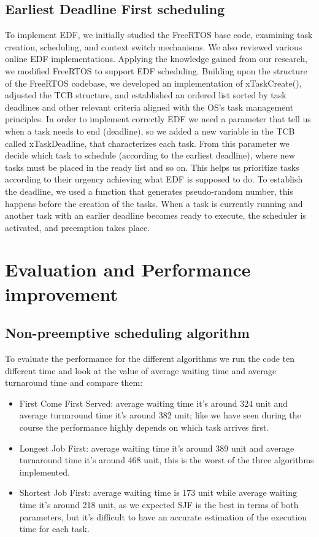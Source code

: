 \subsection{Earliest Deadline First scheduling}
To implement EDF, we initially studied the FreeRTOS base code, examining task creation, scheduling, and context switch mechanisms. We also reviewed various online EDF implementations. Applying the knowledge gained from our research, we modified FreeRTOS to support EDF scheduling.
Building upon the structure of the FreeRTOS codebase, we developed an implementation of xTaskCreate(), adjusted the TCB structure, and established an ordered list sorted by task deadlines and other relevant criteria aligned with the OS's task management principles.
In order to implement correctly EDF we need a parameter that tell us when a task needs to end (deadline), so we added a new variable in the TCB called xTaskDeadline, that characterizes each task. 
From this parameter we decide which task to schedule (according to the earliest deadline), where new tasks must be placed in the ready list and so on. This helps us prioritize tasks according to their urgency achieving what EDF is supposed to do.
To establish the deadline, we used a function that generates pseudo-random number, this happens before the creation of the tasks.
When a task is currently running and another task with an earlier deadline becomes ready to execute, the scheduler is activated, and preemption takes place.


\section{Evaluation and Performance improvement }
\subsection{Non-preemptive scheduling algorithm}
 To evaluate the performance for the different algorithms we run the code ten different time and look at the value of average waiting time and average turnaround time and compare them:
 \begin{itemize}
 \item First Come First Served: average waiting time it's around 324 unit and average turnaround time it's around 382 unit; like we have seen during the course the performance highly depends on which task arrives first. 
 \item Longest Job First: average waiting time it's around 389 unit  and average turnaround time it's around 468 unit, this is the worst of the three algorithms implemented. 
 \item Shortest Job First: average waiting time is 173 unit while average waiting time it's around 218 unit, as we expected SJF is the best in terms of both parameters, but it's difficult to have an accurate estimation of the execution time for each task.
 \end{itemize}


